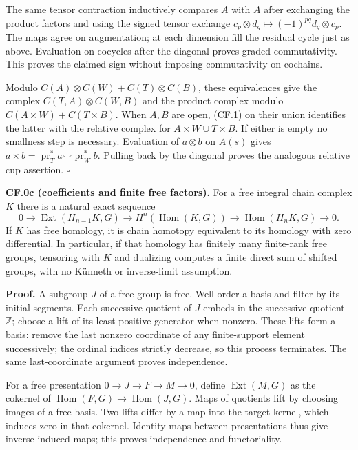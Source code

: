 \documentclass[
  11pt,
]{article}
\begin{document}
The same tensor contraction inductively compares \(A\) with \(A\) after
exchanging the product factors and using the signed tensor exchange
\(c_p\otimes d_q\mapsto(-1)^{pq}d_q\otimes c_p\). The maps agree on
augmentation; at each dimension fill the residual cycle just as above.
Evaluation on cocycles after the diagonal proves graded commutativity.
This proves the claimed sign without imposing commutativity on cochains.

Modulo \(C(A)\otimes C(W)+C(T)\otimes C(B)\), these equivalences give
the complex \(C(T,A)\otimes C(W,B)\) and the product complex modulo
\(C(A\times W)+C(T\times B)\). When \(A,B\) are open, (CF.1) on their
union identifies the latter with the relative complex for
\(A\times W\cup T\times B\). If either is empty no smallness step is
necessary. Evaluation of \(a\otimes b\) on \(A(s)\) gives
\(a\times b=\operatorname{pr}_T^*a\smile\operatorname{pr}_W^*b\).
Pulling back by the diagonal proves the analogous relative cup
assertion. \(\square\)

\textbf{CF.0c (coefficients and finite free factors).} For a free
integral chain complex \(K\) there is a natural exact sequence \[
0\longrightarrow \operatorname{Ext}(H_{n-1}K,G)
\longrightarrow H^n(\operatorname{Hom}(K,G))
\longrightarrow \operatorname{Hom}(H_nK,G)\longrightarrow0.
\tag{CF.3}
\] If \(K\) has free homology, it is chain homotopy equivalent to its
homology with zero differential. In particular, if that homology has
finitely many finite-rank free groups, tensoring with \(K\) and
dualizing computes a finite direct sum of shifted groups, with no
Künneth or inverse-limit assumption.

\textbf{Proof.} A subgroup \(J\) of a free group is free. Well-order a
basis and filter by its initial segments. Each successive quotient of
\(J\) embeds in the successive quotient \(\mathbb Z\); choose a lift of
its least positive generator when nonzero. These lifts form a basis:
remove the last nonzero coordinate of any finite-support element
successively; the ordinal indices strictly decrease, so this process
terminates. The same last-coordinate argument proves independence.

For a free presentation \(0\to J\to F\to M\to0\), define
\(\operatorname{Ext}(M,G)\) as the cokernel of
\(\operatorname{Hom}(F,G)\to\operatorname{Hom}(J,G)\). Maps of quotients
lift by choosing images of a free basis. Two lifts differ by a map into
the target kernel, which induces zero in that cokernel. Identity maps
between presentations thus give inverse induced maps; this proves
independence and functoriality.
\end{document}
